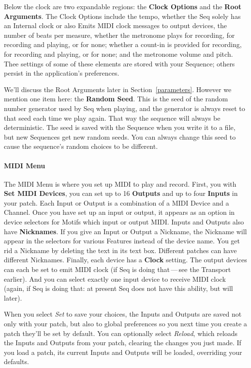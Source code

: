 \documentclass[twoside,10pt]{article}
\begin{document}
Below the clock are two expandable regions: the {\bf Clock Options} and the {\bf Root Arguments}.  The Clock Options include the tempo, whether the Seq solely has an Internal clock or also Emits MIDI clock messages to output devices, the number of beats per measure, whether the metronome plays for recording,  for recording and playing, or for none; whether a count-in is provided for recording, for recording and playing, or for none; and the metronome volume and pitch.  Thee settings of some of these elements are stored with your Sequence; others persist in the application's preferences.

We'll discuss the Root Arguments later in Section~\ref{parameters}.  However we mention one item here: the {\bf Random Seed}.  This is the seed of the random number generator used by Seq when playing, and the generator is always reset to that seed each time we play again.  That way the sequence will always be deterministic.  The seed is saved with the Sequence when you write it to a file, but new Sequences get new random seeds. You can always change this seed to cause the sequence's random choices to be different.

\paragraph{MIDI Menu}

The MIDI Menu is where you set up MIDI to play and record.  First, you with {\bf Set MIDI Devices}, you can set up to 16 {\bf Outputs} and up to four {\bf Inputs} in your patch.  Each Input or Output is a combination of a MIDI Device and a Channel.  Once you have set up an input or output, it appears as an option in device selectors for Motifs which input or output MIDI.  Inputs and Outputs also have {\bf Nicknames}.  If you give an Input or Output a Nickname, the Nickname will appear in the selectors for various Features instead of the device name.  You get rid a Nickname by deleting the text in its text box.  Different patches can have different Nicknames.  Finally, each device has a {\bf Clock} setting.  The output devices can each be set to emit MIDI clock (if Seq is doing that\,---\,see the Transport earlier).  And you can select exactly one input device to receive MIDI clock (again, if Seq is doing that: at present Seq does not have this ability, but will later).

When you select {\it Set} to save your choices, the Inputs and Outputs are saved not only with your patch, but also to global preferences so you next time you create a patch they'll be set by default.  You can optionally select {\it Reload}, which reloads the Inputs and Outputs from your patch, clearing the changes you just made.  If you load a patch, its current Inputs and Outputs will be loaded, overriding your defaults.
\end{document}

